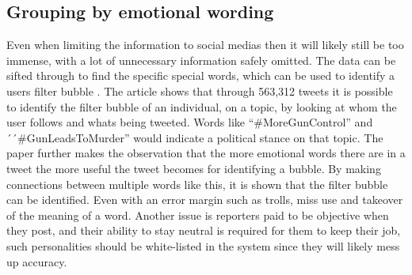 \subsection{Grouping by emotional wording}
Even when limiting the information to social medias then it will likely still be
too immense, with a lot of unnecessary information safely omitted. The data can
be sifted through to find the specific special words, which can be used to
identify a users filter bubble  \citep{EmotionalWords}. The article shows that
through 563,312 tweets it is possible to identify the filter bubble of an
individual, on a topic, by looking at whom the user follows and whats being
tweeted. Words like ``\#MoreGunControl'' and  ´´\#GunLeadsToMurder'' would
indicate a political stance on that topic. The paper further makes the
observation that the more emotional words there are in a tweet the more useful
the tweet becomes for identifying a bubble. By making connections between
multiple words like this, it is shown that the filter bubble can be identified.
Even with an error margin such as trolls, miss use and takeover of the meaning
of a word. Another issue is reporters paid to be objective when they post, and
their ability to stay neutral is required for them to keep their job, such
personalities should be white-listed in the system since they will likely mess
up accuracy.